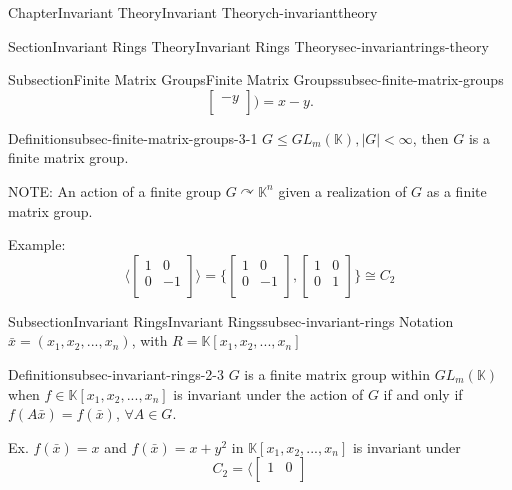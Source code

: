 \documentclass[oneside,10pt,]{book}
\newcommand{\amp}{&}
\begin{document}
\begin{chapterptx}{Chapter}{Invariant Theory}{}{Invariant Theory}{}{}{ch-invarianttheory}
\begin{sectionptx}{Section}{Invariant Rings Theory}{}{Invariant Rings Theory}{}{}{sec-invariantrings-theory}
\begin{subsectionptx}{Subsection}{Finite Matrix Groups}{}{Finite Matrix Groups}{}{}{subsec-finite-matrix-groups}
\begin{equation*}
\begin{bmatrix}
-y  \\
\end{bmatrix})= x-y\text{.}
\end{equation*}
%
\par
\begin{definition}{Definition}{}{subsec-finite-matrix-groups-3-1}%
\(G \leq GL_m(\mathbb{K}), |G| < \infty\), then \(G\) is a finite matrix group.%
\end{definition}
%
\par
NOTE: An action of a finite group \(G \curvearrowright \mathbb{K}^n\) given a realization of \(G\) as a finite matrix group.%
\par
Example:%
\begin{equation*}
\langle \begin{bmatrix}
1 \amp 0 \\
0 \amp -1 \\
\end{bmatrix} \rangle = \{ \begin{bmatrix}
1 \amp 0 \\
0 \amp -1 \\
\end{bmatrix},\begin{bmatrix}
1 \amp 0 \\
0 \amp 1 \\
\end{bmatrix}\} \cong C_2
\end{equation*}
%
\end{subsectionptx}
%
%
\typeout{************************************************}
\typeout{************************************************}
%
\begin{subsectionptx}{Subsection}{Invariant Rings}{}{Invariant Rings}{}{}{subsec-invariant-rings}
Notation \(\bar x = (x_1, x_2,..., x_n)\), with \(R = \mathbb{K}[x_1,x_2,...,x_n]\) \begin{definition}{Definition}{}{subsec-invariant-rings-2-3}%
\(G\) is a finite matrix group within \(GL_m(\mathbb{K})\) when \(f\in \mathbb{K}[x_1,x_2,...,x_n]\) is invariant under the action of \(G\) if and only if \(f(A\bar x) = f(\bar x)\),  \(\forall A \in G\).%
\end{definition}
%
\par
Ex. \(f(\bar x)=x\) and \(f(\bar x) = x +y^2\) in \(\mathbb{K}[x_1,x_2,...,x_n]\) is invariant under%
\begin{equation*}
C_2 = \langle\begin{bmatrix}
1 \amp 0 \\

\end{bmatrix}
\end{equation*}
\end{subsectionptx}
\end{sectionptx}
\end{chapterptx}
\end{document}
